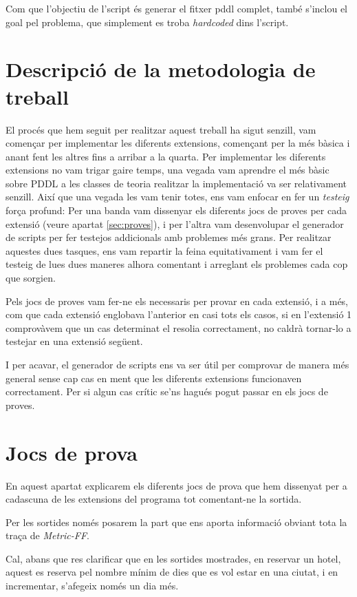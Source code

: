 \documentclass[11pt,a4paper]{article}
\begin{document}
Com que l'objectiu de l'script és generar el fitxer pddl complet, també s'inclou el goal pel problema, que simplement es troba \emph{hardcoded} dins l'script.

\section{Descripció de la metodologia de treball}

El procés que hem seguit per realitzar aquest treball ha sigut senzill, vam començar per implementar les diferents extensions, començant per la més bàsica i anant fent les altres fins a arribar a la quarta. Per implementar les diferents extensions no vam trigar gaire temps, una vegada vam aprendre el més bàsic sobre PDDL a les classes de teoria realitzar la implementació va ser relativament senzill. Així que una vegada les vam tenir totes, ens vam enfocar en fer un \emph{testeig} força profund: Per una banda vam dissenyar els diferents jocs de proves per cada extensió (veure apartat \ref{sec:proves}), i per l'altra vam desenvolupar el generador de scripts per fer testejos addicionals amb problemes més grans. Per realitzar aquestes dues tasques, ens vam repartir la feina equitativament i vam fer el testeig de lues dues maneres alhora comentant i arreglant els problemes cada cop que sorgien.

Pels jocs de proves vam fer-ne els necessaris per provar en cada extensió, i a més, com que cada extensió englobava l'anterior en casi tots els casos, si en l'extensió 1 comprovàvem que un cas determinat el resolia correctament, no caldrà tornar-lo a testejar en una extensió següent.

I per acavar, el generador de scripts ens va ser útil per comprovar de manera més general sense cap cas en ment que les diferents extensions funcionaven correctament. Per si algun cas crític se'ns hagués pogut passar en els jocs de proves.

\section{Jocs de prova}

En aquest apartat explicarem els diferents jocs de prova que hem dissenyat per a cadascuna de les extensions del programa tot comentant-ne la sortida.

Per les sortides només posarem la part que ens aporta informació obviant tota la traça de \emph{Metric-FF}. 

Cal, abans que res clarificar que en les sortides mostrades, en reservar un hotel, aquest es reserva pel nombre mínim de dies que es vol estar en una ciutat, i en incrementar, s'afegeix només un dia més.
\end{document}
